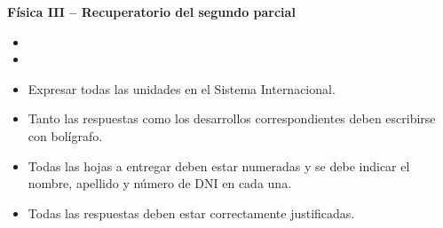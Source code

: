 \documentclass[addpoints]{exam}
\begin{document}
\renewcommand{\tablename}{Tabla}


\begin{tcolorbox}[colback=white,arc=0mm,colframe=black]
    \begin{center}
        \Large\textbf{Física III -- Recuperatorio del segundo parcial}
    \end{center}
\end{tcolorbox}

\begin{itemize}
    \item {}
    \item {}
\end{itemize}

\begin{tcolorbox}[colback=black!5!white,arc=0mm,breakable,pad at break*=1mm,colframe=black!25!white,title=\textbf{\textcolor{black}{Instrucciones generales}}]
    \begin{itemize}
        \item Expresar todas las unidades en el Sistema Internacional.
        \item Tanto las respuestas como los desarrollos correspondientes deben escribirse con bolígrafo.
        \item Todas las hojas a entregar deben estar numeradas y se debe indicar el nombre, apellido y número de DNI en cada una.
        \item Todas las respuestas deben estar correctamente justificadas.
    \end{itemize}
\end{tcolorbox}
\end{document}

